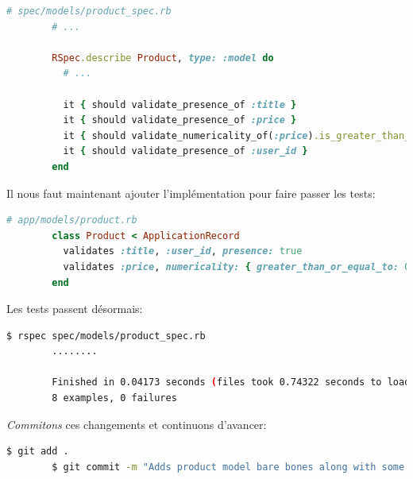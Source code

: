 \documentclass[]{report}
\begin{document}
      \begin{scriptsize}
        \begin{lstlisting}[language=ruby, caption={Ajout de tests de présences pour les produits}, label={lst:add_presence_to_product_test}]
        # spec/models/product_spec.rb
        # ...

        RSpec.describe Product, type: :model do
          # ...

          it { should validate_presence_of :title }
          it { should validate_presence_of :price }
          it { should validate_numericality_of(:price).is_greater_than_or_equal_to(0) }
          it { should validate_presence_of :user_id }
        end
        \end{lstlisting}
      \end{scriptsize}

      Il nous faut maintenant ajouter l'implémentation pour faire passer les tests:

      \begin{scriptsize}
        \begin{lstlisting}[language=ruby]
        # app/models/product.rb
        class Product < ApplicationRecord
          validates :title, :user_id, presence: true
          validates :price, numericality: { greater_than_or_equal_to: 0 }, presence: true
        end
        \end{lstlisting}
      \end{scriptsize}

      Les tests passent désormais:

      \begin{scriptsize}
        \begin{lstlisting}[language=bash]
        $ rspec spec/models/product_spec.rb
        ........

        Finished in 0.04173 seconds (files took 0.74322 seconds to load)
        8 examples, 0 failures
        \end{lstlisting}
      \end{scriptsize}

      \textit{Commitons} ces changements et continuons d'avancer:

      \begin{scriptsize}
        \begin{lstlisting}[language=bash]
        $ git add .
        $ git commit -m "Adds product model bare bones along with some validations"
        \end{lstlisting}
      \end{scriptsize}
\end{document}
